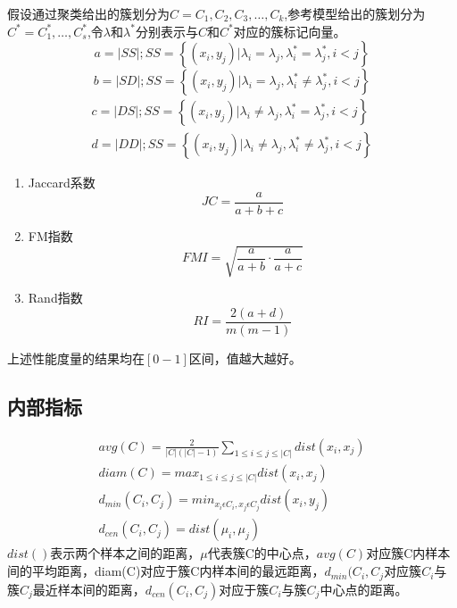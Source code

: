 \documentclass{article}
\begin{document}
	假设通过聚类给出的簇划分为$C={C_{1},C_{2},C_{3},\ldots,C_k}$,参考模型给出的簇划分为$C^{*}={C_{1}^{*},\ldots,C_{s}^{*}}$,令$\lambda $和$\lambda ^{*}$分别表示与$C$和$C^{*}$对应的簇标记向量。
	\begin{equation}
	a=\left | SS \right |;SS=\left \{ \left ( x_{i},y_{j} \right )|\lambda _{i}=\lambda _{j},\lambda _{i}^{*}=\lambda _{j}^{*},i< j \right \}
	\end{equation}
	\begin{equation}
	b=\left | SD \right |;SS=\left \{ \left ( x_{i},y_{j} \right )|\lambda _{i}=\lambda _{j},\lambda _{i}^{*}\neq \lambda _{j}^{*},i< j \right \}
	\end{equation}
	\begin{eqnarray}
	c=\left | DS \right |;SS=\left \{ \left ( x_{i},y_{j} \right )|\lambda _{i}\neq \lambda _{j},\lambda _{i}^{*}=  \lambda _{j}^{*},i< j \right \}\\
	d=\left | DD \right |;SS=\left \{ \left ( x_{i},y_{j} \right )|\lambda _{i}\neq \lambda _{j},\lambda _{i}^{*}\neq   \lambda _{j}^{*},i< j \right \}
	\end{eqnarray}
	\begin{enumerate}
		\item Jaccard系数
		\begin{equation}
		JC=\frac{a}{a+b+c}
		\end{equation}
	\item FM指数
	\begin{equation}
	FMI=\sqrt{\frac{a}{a+b}\cdot \frac{a}{a+c}}
	\end{equation}
	\item Rand指数
	\begin{equation}
	RI=\frac{2\left ( a+d \right )}{m\left ( m-1 \right )}
	\end{equation}
	\end{enumerate}
	上述性能度量的结果均在$[0-1]$区间，值越大越好。
	
	\subsection{内部指标}
	\begin{eqnarray}
	avg(C)=\frac{2}{\left | C \right |\left ( \left | C \right |-1 \right )}\sum _{1\leq i\leq j\leq \left | C \right |}dist(x_{i},x_{j})\\
	diam(C)=max_{1\leq i\leq j\leq \left | C \right |}dist(x_{i},x_{j})\\
	d_{min}\left ( C_{i},C_{j} \right )=min_{x_{i}\epsilon C_{i},x_{j}\epsilon C_{j}}dist(x_{i},y_{j})\\
	d_{cen}(C_{i},C_{j})=dist(\mu _{i},\mu _{j})	
	\end{eqnarray}
	$dist()$表示两个样本之间的距离，$\mu $代表簇C的中心点，$avg(C)$对应簇C内样本间的平均距离，diam(C)对应于簇C内样本间的最远距离，$d_{min}(C_{i},C_{j}$对应簇$C_{i}$与簇$C_{j}$最近样本间的距离，$d_{cen}(C_{i},C_{j})$对应于簇$C_{i}$与簇$C_{j}$中心点的距离。
	
\end{document}
